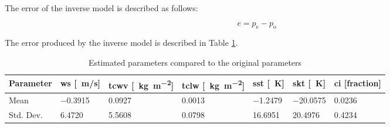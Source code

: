 \documentclass[11pt, a4paper]{article}
\begin{document}
The error of the inverse model is described as follows:

\begin{equation*}
e = p_\text{e} - p_\text{o}
\end{equation*}

The error produced by the inverse model is described in Table \ref{tab:errorinv}.

\begin{table}[h!]
\centering
\begin{tabular}{@{} l l l l l l l @{}}
Parameter & ws [\SI{}{m/s}] & tcwv [\SI{}{\kilo\gram\per\square\meter}] & tclw [\SI{}{\kilo\gram\per\square\meter}] & sst [\SI{}{K}] & skt [\SI{}{K}] & ci [fraction] \\
\midrule
Mean & \SI{-0.3915}{} & \SI{0.0927}{} & \SI{0.0013}{} & \SI{-1.2479}{} & \SI{-20.0575}{} & \SI{0.0236}{} \\
Std. Dev. & \SI{6.4720}{} & \SI{5.5608}{} & \SI{0.0798}{} & \SI{16.6951}{} & \SI{20.4976}{} & \SI{0.4234}{} \\
\midrule
\end{tabular}
\caption{Estimated parameters compared to the original parameters}
\label{tab:errorinv}
\end{table}
\end{document}
